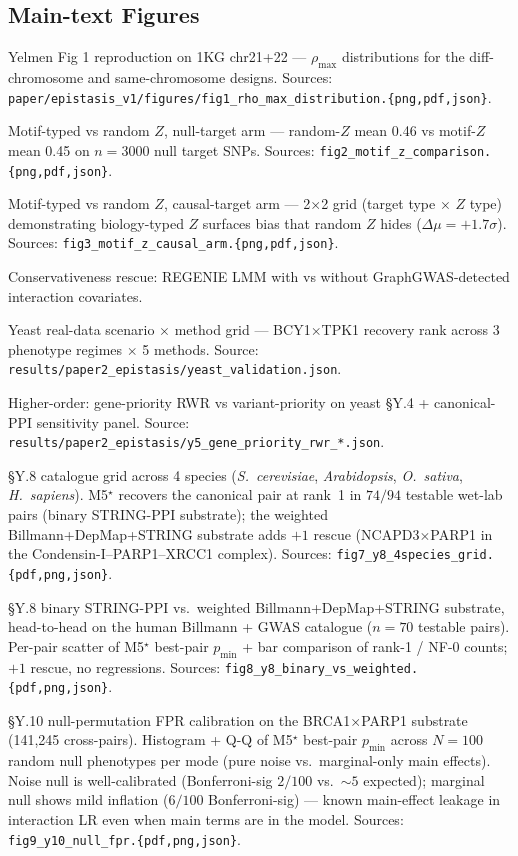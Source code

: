 \documentclass[pdflatex,sn-nature]{sn-jnl}
\begin{document}
\subsection*{Main-text Figures}
\begin{description}
\setlength{\itemsep}{2pt}
\item[Figure 1] Yelmen Fig 1 reproduction on 1KG chr21+22 — $\rho_{\max}$ distributions for the diff-chromosome and same-chromosome designs. Sources: \texttt{paper/epistasis\_v1/figures/fig1\_rho\_max\_distribution.\{png,pdf,json\}}.
\item[Figure 2] Motif-typed vs random $Z$, null-target arm — random-$Z$ mean 0.46 vs motif-$Z$ mean 0.45 on $n=3000$ null target SNPs. Sources: \texttt{fig2\_motif\_z\_comparison.\{png,pdf,json\}}.
\item[Figure 3] Motif-typed vs random $Z$, causal-target arm — 2$\times$2 grid (target type $\times$ $Z$ type) demonstrating biology-typed $Z$ surfaces bias that random $Z$ hides ($\Delta\mu=+1.7\sigma$). Sources: \texttt{fig3\_motif\_z\_causal\_arm.\{png,pdf,json\}}.
\item[Figure 4] [PLACEHOLDER] Conservativeness rescue: REGENIE LMM with vs without GraphGWAS-detected interaction covariates.
\item[Figure 5] [PLACEHOLDER] Yeast real-data scenario $\times$ method grid — BCY1$\times$TPK1 recovery rank across 3 phenotype regimes $\times$ 5 methods. Source: \texttt{results/paper2\_epistasis/yeast\_validation.json}.
\item[Figure 6] [PLACEHOLDER] Higher-order: gene-priority RWR vs variant-priority on yeast §Y.4 + canonical-PPI sensitivity panel. Source: \texttt{results/paper2\_epistasis/y5\_gene\_priority\_rwr\_*.json}.
\item[Figure 7] §Y.8 catalogue grid across 4 species (\emph{S.~cerevisiae}, \emph{Arabidopsis}, \emph{O.~sativa}, \emph{H.~sapiens}). M5$^\star$ recovers the canonical pair at rank~1 in $74/94$ testable wet-lab pairs (binary STRING-PPI substrate); the weighted Billmann+DepMap+STRING substrate adds $+1$ rescue (NCAPD3$\times$PARP1 in the Condensin-I--PARP1--XRCC1 complex). Sources: \texttt{fig7\_y8\_4species\_grid.\{pdf,png,json\}}.
\item[Figure 8] §Y.8 binary STRING-PPI vs.\ weighted Billmann+DepMap+STRING substrate, head-to-head on the human Billmann + GWAS catalogue ($n=70$ testable pairs). Per-pair scatter of M5$^\star$ best-pair $p_{\min}$ + bar comparison of rank-1 / NF-0 counts; $+1$ rescue, no regressions. Sources: \texttt{fig8\_y8\_binary\_vs\_weighted.\{pdf,png,json\}}.
\item[Figure 9] §Y.10 null-permutation FPR calibration on the BRCA1$\times$PARP1 substrate (141{,}245 cross-pairs). Histogram + Q-Q of M5$^\star$ best-pair $p_{\min}$ across $N=100$ random null phenotypes per mode (pure noise vs.\ marginal-only main effects). Noise null is well-calibrated (Bonferroni-sig $2/100$ vs.\ $\sim 5$ expected); marginal null shows mild inflation ($6/100$ Bonferroni-sig) — known main-effect leakage in interaction LR even when main terms are in the model. Sources: \texttt{fig9\_y10\_null\_fpr.\{pdf,png,json\}}.
\end{description}
\end{document}
